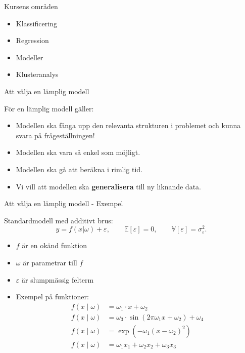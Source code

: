 \documentclass[10pt,english]{beamer}
\begin{document}
\begin{frame}{Kursens områden}
    \begin{itemize}
        \item Klassificering
        \item Regression
        \item Modeller
        \item Klusteranalys
    \end{itemize}
\end{frame}

\begin{frame}{Att välja en lämplig modell}

    För en lämplig modell gäller:
    \begin{itemize}
        \item Modellen ska fånga upp den relevanta strukturen i problemet och kunna svara på frågeställningen!
        \item Modellen ska vara så enkel som möjligt.
        \item Modellen ska gå att beräkna i rimlig tid.
        \item Vi vill att modellen ska \textbf{generalisera} till ny liknande data.
    \end{itemize}

\end{frame}

\begin{frame}{Att välja en lämplig modell - Exempel}
    
    Standardmodell med additivt brus:
    \begin{equation*}
        y = f(x | \omega) + \varepsilon, \qquad \mathbb{E}[\varepsilon] = 0, \qquad \mathbb{V}[\varepsilon] = \sigma^2_{\varepsilon}.
    \end{equation*}

    \begin{itemize}
        \item $f$ är en okänd funktion
        \item $\omega$ är parametrar till $f$
        \item $\varepsilon$ är slumpmässig felterm
        \item Exempel på funktioner:
        \begin{align*}
            f(x \mid \omega) &= \omega_1 \cdot x + \omega_2 \\
            f(x \mid \omega) &= \omega_3 \cdot \sin(2\pi \omega_1 x + \omega_2) + \omega_4 \\
            f(x \mid \omega) &= \exp(- \omega_1 (x - \omega_2)^2) \\
            f(x \mid \omega) &= \omega_1 x_1 + \omega_2 x_2 + \omega_3 x_3 \\
        \end{align*}
    \end{itemize}

\end{frame}
\end{document}
